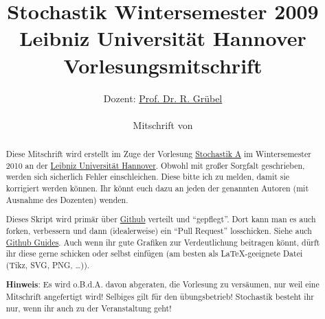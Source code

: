 \documentclass[a4paper,twoside,12pt]{article}
\title{Stochastik Wintersemester 2009\\Leibniz Universit\"at Hannover\\Vorlesungsmitschrift}
\author{Dozent: \href{mailto:rgrubel@stochastik.uni-hannover.de}{Prof. Dr. R. Gr\"ubel}\\ \vspace{1em} \\
Mitschrift von\\
}
\begin{document}
\pagestyle{empty}
\maketitle
\begin{abstract}
	Diese Mitschrift wird erstellt im Zuge der Vorlesung \href{http://www.stochastik.uni-hannover.de/ws2010.html}{Stochastik A} im Wintersemester 2010 an der \href{http://www.uni-hannover.de}{Leibniz Universit\"at Hannover}. Obwohl mit gro\ss er Sorgfalt geschrieben, werden sich sicherlich Fehler einschleichen. Diese bitte ich zu melden, damit sie korrigiert werden k\"onnen. Ihr k\"onnt euch dazu an jeden der genannten Autoren (mit Ausnahme des Dozenten) wenden.
	
	Dieses Skript wird prim\"ar \"uber \href{http://github.com/rbecher/luh-vorlesungen-inf-ws10-stoch}{Github} verteilt und "`gepflegt"'. Dort kann man es auch forken, verbessern und dann (idealerweise) ein "`Pull Request"' losschicken. Siehe auch  \href{http://github.com/guides}{Github Guides}. Auch wenn ihr gute Grafiken zur Verdeutlichung beitragen k\"onnt, d\"urft ihr diese gerne schicken oder selbst einf\"ugen (am besten als \LaTeX -geeignete Datei (Tikz, SVG, PNG, \dots)).
	
	\textbf{Hinweis}: Es wird o.B.d.A. davon abgeraten, die Vorlesung zu vers\"aumen, nur weil eine Mitschrift angefertigt wird! Selbiges gilt f\"ur den \"ubungsbetrieb! Stochastik besteht ihr nur, wenn ihr auch zu der Veranstaltung geht!
\end{abstract}

\newpage %

\tableofcontents


\newpage

\pagestyle{fancy}
\addtolength{\headheight}{\baselineskip}
\renewcommand{\sectionmark}[1]{\markboth{#1}{}}
\renewcommand{\subsectionmark}[1]{\markright{#1}}
\fancyhead[LO,RE]{\leftmark\\\rightmark}

                 





%

%
\end{document}
